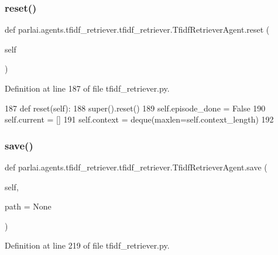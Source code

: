 \subsubsection{\texorpdfstring{reset()}{reset()}}
{\footnotesize\ttfamily def parlai.\+agents.\+tfidf\+\_\+retriever.\+tfidf\+\_\+retriever.\+Tfidf\+Retriever\+Agent.\+reset (\begin{DoxyParamCaption}\item[{}]{self }\end{DoxyParamCaption})}



Definition at line 187 of file tfidf\+\_\+retriever.\+py.


\begin{DoxyCode}
187     \textcolor{keyword}{def }reset(self):
188         super().reset()
189         self.episode\_done = \textcolor{keyword}{False}
190         self.current = []
191         self.context = deque(maxlen=self.context\_length)
192 
\end{DoxyCode}
\mbox{\label{classparlai_1_1agents_1_1tfidf__retriever_1_1tfidf__retriever_1_1TfidfRetrieverAgent_af740335de006f8ead33b632afa1c4dcd}} 
\subsubsection{\texorpdfstring{save()}{save()}}
{\footnotesize\ttfamily def parlai.\+agents.\+tfidf\+\_\+retriever.\+tfidf\+\_\+retriever.\+Tfidf\+Retriever\+Agent.\+save (\begin{DoxyParamCaption}\item[{}]{self,  }\item[{}]{path = {\ttfamily None} }\end{DoxyParamCaption})}



Definition at line 219 of file tfidf\+\_\+retriever.\+py.


